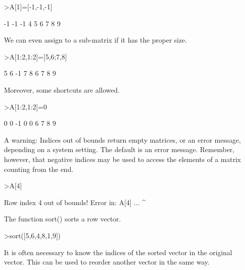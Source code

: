 \documentclass{article}
\begin{document}
\begin{eulernotebook}
\begin{eulercomment}
\begin{eulercomment}
\begin{eulercomment}
\begin{eulercomment}
\begin{eulercomment}
\begin{eulercomment}
\begin{eulerprompt}
>A[1]=[-1,-1,-1]
\end{eulerprompt}
\begin{euleroutput}
             -1            -1            -1 
              4             5             6 
              7             8             9 
\end{euleroutput}
\begin{eulercomment}
We can even assign to a sub-matrix if it has the proper size.
\end{eulercomment}
\begin{eulerprompt}
>A[1:2,1:2]=[5,6;7,8]
\end{eulerprompt}
\begin{euleroutput}
              5             6            -1 
              7             8             6 
              7             8             9 
\end{euleroutput}
\begin{eulercomment}
Moreover, some shortcuts are allowed.
\end{eulercomment}
\begin{eulerprompt}
>A[1:2,1:2]=0
\end{eulerprompt}
\begin{euleroutput}
              0             0            -1 
              0             0             6 
              7             8             9 
\end{euleroutput}
\begin{eulercomment}
A warning: Indices out of bounds return empty matrices, or an error
message, depending on a system setting. The default is an error
message. Remember, however, that negative indices may be used to
access the elements of a matrix counting from the end.
\end{eulercomment}
\begin{eulerprompt}
>A[4]
\end{eulerprompt}
\begin{euleroutput}
  Row index 4 out of bounds!
  Error in:
  A[4] ...
      ^
\end{euleroutput}
\begin{eulercomment}
The function sort() sorts a row vector.
\end{eulercomment}
\begin{eulerprompt}
>sort([5,6,4,8,1,9])
\end{eulerprompt}
\begin{euleroutput}
  [1,  4,  5,  6,  8,  9]
\end{euleroutput}
\begin{eulercomment}
It is often necessary to know the indices of the sorted vector in the
original vector. This can be used to reorder another vector in the
same way.


\end{eulercomment}
\end{eulercomment}
\end{eulercomment}
\end{eulercomment}
\end{eulercomment}
\end{eulercomment}
\end{eulercomment}
\end{eulernotebook}
\end{document}
